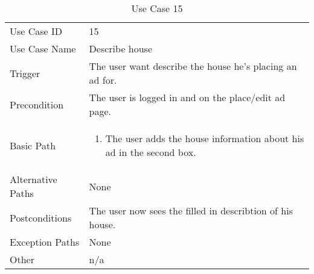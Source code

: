 \begin{table}[H]
\centering
\label{table-use-case-15}
\begin{tabular}{|p{3cm}|p{10cm}}
Use Case ID       & 15                                                      \\
Use Case Name     & Describe house                            \\
Trigger           & The user want describe the house he's placing an ad for.\\
Precondition      & The user is logged in and on the place/edit ad page.            
\\
Basic Path        & \begin{enumerate}
\item		The user adds the house information about his ad in the second box. 
\end{enumerate} 
     \\
Alternative Paths & None                          \\
Postconditions    & The user now sees the filled in describtion of his house.	\\
Exception Paths   & None			\\
Other             & n/a                                                                                                                                                                                                        
\end{tabular}
\caption{Use Case 15}
\end{table}

